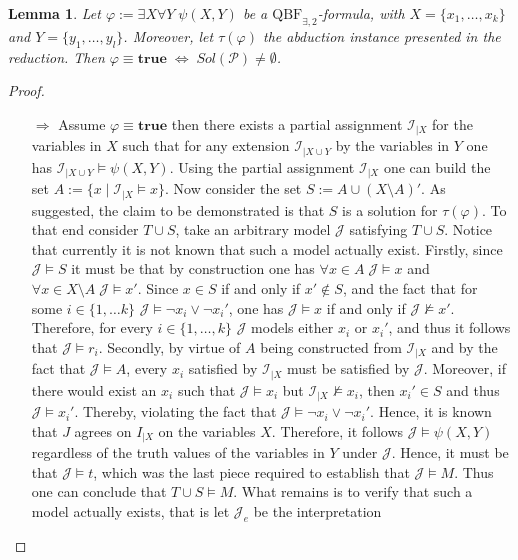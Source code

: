 \documentclass [11pt]{article}
\renewcommand{\phi}{\varphi}
\newcommand{\True}{\mathbf{true}}
\newcommand{\nmodels}{\not\models}
\newtheorem{lemma}[theorem]{Lemma}
\begin{document}
\begin{lemma}
Let $\varphi := \exists X \forall Y \;  \psi(X,Y)$ be a $\mathrm{QBF}_{\exists,2}$-formula, with $X = \{x_1, \dots, x_k \}$ and $Y = \{y_1, \dots, y_l\}$. Moreover, let $\tau(\varphi)$ the abduction instance presented in the reduction.
Then  $\phi \equiv \True \;  \iff \; Sol(\mathcal{P}) \neq \emptyset$.
\end{lemma}
\begin{proof}
\begin{itemize}
\item[$\Rightarrow$] Assume $\phi \equiv \True $ then there exists a partial assignment $\mathcal{I}_{|X}$ for the variables in $X$ such that for any extension $\mathcal{I}_{|X \cup Y}$ by the variables in $Y$ one has $\mathcal{I}_{|X \cup Y} \models \psi(X,Y)$. Using the partial assignment $\mathcal{I}_{|X}$ one can build the set $A:=\{x \mid \mathcal{I}_{|X} \models x\}$. Now consider the set $S:= A \cup (X \setminus A)'$. As suggested, the claim to be demonstrated is that $S$ is a solution for $\tau(\varphi)$. To that end consider $T \cup S$, take an arbitrary model $\mathcal{J}$ satisfying $T \cup S$. Notice that currently it is not known that such a model actually exist. 
Firstly, since $\mathcal{J} \models S$ it must be that by construction one has $\forall x \in A\; \mathcal{J} \models x$ and $\forall x \in X\setminus A \; \mathcal{J}\models x'$. Since $x \in S$ if and only if $x' \notin S$, and the fact that  for some $i \in \{1, \dots k\}$ $\mathcal{J} \models \neg x_i \lor \neg x_i'$, one has $\mathcal{J} \models x$ if and only if $\mathcal{J} \nmodels x'$. Therefore, for every $i \in \{1, \dots  , k\}$ $\mathcal{J}$ models either $x_i$ or $x_i'$, and thus it follows that $\mathcal{J} \models r_i$. 
Secondly, by virtue of $A$ being constructed from $\mathcal{I}_{|X}$ and by the fact that $\mathcal{J} \models A$, every $x_i$ satisfied by $\mathcal{I}_{|X}$ must be satisfied by $\mathcal{J}$. Moreover, if there would exist an $x_i$ such that $\mathcal{J} \models x_i$ but $\mathcal{I}_{|X} \nmodels x_i$, then $x_i' \in S$ and thus $\mathcal{J} \models x_i'$. Thereby, violating the fact that $\mathcal{J} \models \neg x_i \lor \neg x_i'$. Hence, it is known that $J$ agrees on $I_{|X}$ on the variables $X$. Therefore, it follows $\mathcal{J} \models \psi(X,Y)$ regardless of the truth values of the variables in $ Y$ under $\mathcal{J}$. Hence, it must be that $\mathcal{J} \models t$, which was the last piece required to establish that $\mathcal{J} \models M$. Thus one can conclude that $T \cup S \models M$. What remains is to verify that such a model actually exists, that is let $\mathcal{J}_e$ be the interpretation

\end{itemize}
\end{proof}
\end{document}
